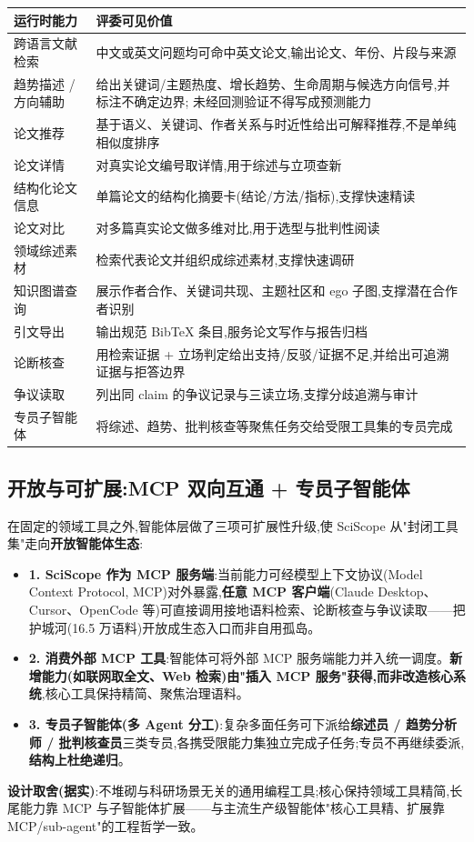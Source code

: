 \begin{tableblock}
\begin{tabularx}{0.96\textwidth}{p{38mm}X}
\toprule
\textbf{运行时能力} & \textbf{评委可见价值} \\
\midrule
跨语言文献检索 & 中文或英文问题均可命中英文论文,输出论文、年份、片段与来源 \\
趋势描述 / 方向辅助 & 给出关键词/主题热度、增长趋势、生命周期与候选方向信号,并标注不确定边界; 未经回测验证不得写成预测能力 \\
论文推荐 & 基于语义、关键词、作者关系与时近性给出可解释推荐,不是单纯相似度排序 \\
论文详情 & 对真实论文编号取详情,用于综述与立项查新 \\
结构化论文信息 & 单篇论文的结构化摘要卡(结论/方法/指标),支撑快速精读 \\
论文对比 & 对多篇真实论文做多维对比,用于选型与批判性阅读 \\
领域综述素材 & 检索代表论文并组织成综述素材,支撑快速调研 \\
知识图谱查询 & 展示作者合作、关键词共现、主题社区和 ego 子图,支撑潜在合作者识别 \\
引文导出 & 输出规范 BibTeX 条目,服务论文写作与报告归档 \\
论断核查 & 用检索证据 + 立场判定给出支持/反驳/证据不足,并给出可追溯证据与拒答边界 \\
争议读取 & 列出同 claim 的争议记录与三读立场,支撑分歧追溯与审计 \\
专员子智能体 & 将综述、趋势、批判核查等聚焦任务交给受限工具集的专员完成 \\
\bottomrule
\end{tabularx}
\end{tableblock}

\subsection{开放与可扩展:MCP 双向互通 + 专员子智能体}
在固定的领域工具之外,智能体层做了三项可扩展性升级,使 SciScope 从"封闭工具集"走向\textbf{开放智能体生态}:
\begin{itemize}
\item \textbf{1. SciScope 作为 MCP 服务端}:当前能力可经模型上下文协议(Model Context Protocol, MCP)对外暴露,\textbf{任意 MCP 客户端}(Claude Desktop、Cursor、OpenCode 等)可直接调用接地语料检索、论断核查与争议读取——把护城河(16.5 万语料)开放成生态入口而非自用孤岛。
\item \textbf{2. 消费外部 MCP 工具}:智能体可将外部 MCP 服务端能力并入统一调度。\textbf{新增能力(如联网取全文、Web 检索)由"插入 MCP 服务"获得,而非改造核心系统},核心工具保持精简、聚焦治理语料。
\item \textbf{3. 专员子智能体(多 Agent 分工)}:复杂多面任务可下派给\textbf{综述员 / 趋势分析师 / 批判核查员}三类专员,各携受限能力集独立完成子任务;专员不再继续委派,\textbf{结构上杜绝递归}。
\end{itemize}
\begin{plainbox}
\textbf{设计取舍(据实)}:不堆砌与科研场景无关的通用编程工具;核心保持领域工具精简,长尾能力靠 MCP 与子智能体扩展——与主流生产级智能体"核心工具精、扩展靠 MCP/sub-agent"的工程哲学一致。
\end{plainbox}

